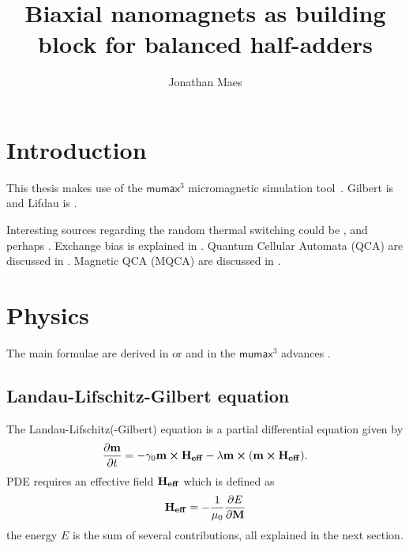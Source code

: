 \documentclass[10pt,a4paper]{article}
\author{Jonathan Maes}
\title{Biaxial nanomagnets as building block for balanced half-adders}
\newcommand{\mumax}{$\mathsf{mumax}^3$}
\begin{document}
\begin{titlingpage}
\maketitle
\end{titlingpage}

\newpage
{}

\tableofcontents
\newpage
{}

\section{Introduction}
This thesis makes use of the \mumax{} micromagnetic simulation tool~\cite{MuMax3}.
Gilbert is \cite{Gilbert1956} and Lifdau is \cite{LANDAU1992}.

Interesting sources regarding the random thermal switching could be \cite{ThermFluc_SingleDomain, RandomSwitch_MonteCarlo, Nonmonotonic_reversal}, and perhaps \cite{MagDynamics_JumpNoise}.
Exchange bias is explained in \cite{ExchangeBias, ExchangeBias_nanostructures, ExchangeBias_Mechanisms}.
Quantum Cellular Automata (QCA) are discussed in \cite{QCA_Algorithms, QCA_ImageRecognition, QCA_GameOfLife}. Magnetic QCA (MQCA) are discussed in \cite{MQCA_MajorityGate, MQCA_RoomTemp}.

\section{Physics}
The main formulae are derived in \cite{abert2013discrete} or \cite{NML_Carlton} and in the \mumax{} advances \cite{MuMax3_advances}.
\subsection{Landau-Lifschitz-Gilbert equation}
The Landau-Lifschitz(-Gilbert) equation is a partial differential equation given by
\begin{equation}
	\frac{\partial \vb{m}}{\partial t} = - \gamma_0 \vb{m} \cross \vb{H_{eff}} - \lambda \vb{m} \cross (\vb{m} \cross \vb{H_{eff}}) \mathrm{.}
\end{equation}
PDE requires an effective field $\vb{H_{eff}}$ which is defined as
\begin{equation}
	\vb{H_{eff}} = - \frac{1}{\mu_0} \frac{\partial E}{\partial \vb{M}}
\end{equation}
the energy $E$ is the sum of several contributions, all explained in the next section.
\end{document}
